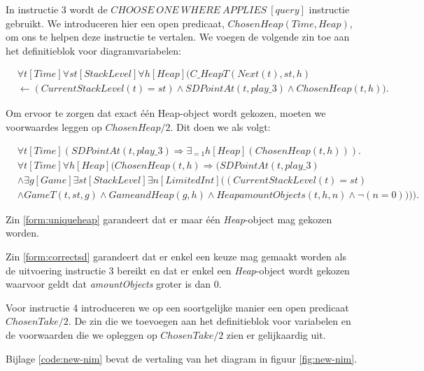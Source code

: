 In instructie 3 wordt de $CHOOSE\ ONE\ WHERE\ APPLIES\ [query]$ instructie gebruikt. We introduceren hier een open predicaat, $ChosenHeap(Time, Heap)$, om ons te helpen deze instructie te vertalen. We voegen de volgende zin toe aan het definitieblok voor diagramvariabelen:

\begin{align}
	\nonumber &\forall{t}[Time]\forall{st}[StackLevel]\forall{h}[Heap](C\_HeapT(Next(t), st, h) \\ &\leftarrow (CurrentStackLevel(t) = st) \land SDPointAt(t, play\_3) \land ChosenHeap(t, h)).
\end{align}

Om ervoor te zorgen dat exact \'e\'en Heap-object wordt gekozen, moeten we voorwaardes leggen op $ChosenHeap/2$. Dit doen we als volgt:

\begin{align}
	&\forall{t}[Time](SDPointAt(t, play\_3) \Rightarrow \exists_{=1}{h}[Heap](ChosenHeap(t, h))).\label{form:uniqueheap} \\
	\nonumber &\forall{t}[Time]\forall{h}[Heap](ChosenHeap(t, h) \Rightarrow (SDPointAt(t, play\_3) \\ \nonumber &\land \exists{g}[Game]\exists{st}[StackLevel]\exists{n}[LimitedInt]((CurrentStackLevel(t) = st) \\ &\land GameT(t, st, g) \land GameandHeap(g, h) \land HeapamountObjects(t, h, n) \land \lnot(n = 0)))).\label{form:correctsd}
\end{align}

Zin \ref{form:uniqueheap} garandeert dat er maar \'e\'en \textit{Heap}-object mag gekozen worden.

Zin \ref{form:correctsd} garandeert dat er enkel een keuze mag gemaakt worden als de uitvoering instructie 3 bereikt en dat er enkel een \textit{Heap}-object wordt gekozen waarvoor geldt dat \textit{amountObjects} groter is dan 0.

Voor instructie 4 introduceren we op een soortgelijke manier een open predicaat $ChosenTake/2$. De zin die we toevoegen aan het definitieblok voor variabelen en de voorwaarden die we opleggen op $ChosenTake/2$ zien er gelijkaardig uit.

Bijlage \ref{code:new-nim} bevat de vertaling van het diagram in figuur \ref{fig:new-nim}.